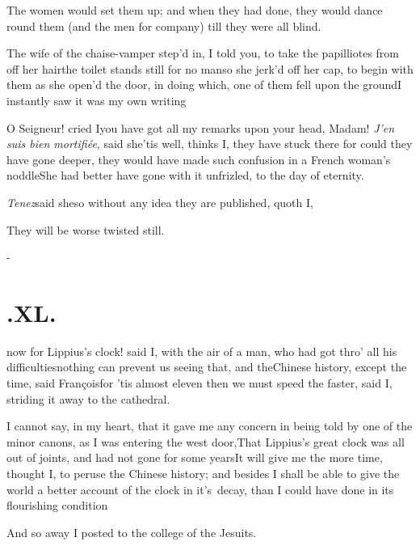 \documentclass{article}
\begin{document}
The women would set them up; and when they had done, they would
dance round them (and the men for company) till they were all
blind.

The wife of the chaise-vamper step’d in, I told you, to
take the papilliotes from off her hair\tsh the toilet
stands still for no man\tsh so she jerk’d off her
cap, to begin with them as she open’d the door, in doing
which, one of them fell upon the ground\tsk I instantly saw it was my own
writing\tsh

O Seigneur! cried I\tsk you have got all my remarks upon your
head, Madam!\break
\tsh \textit{J’en suis bien
mortifiée}, said she\tsh ’tis well, thinks
I, they have stuck there\break
\tsk for could they have gone deeper,
they would have made such confusion in a French
woman’s noddle\tsk She had better have gone with it
unfrizled, to the day of eternity.

\textit{Tenez}\tsk said she\tsk so without any idea
they are published, quoth I,\tsh

They will be worse twisted still.

\vfill{}\eject
\null\kern-\baselineskip
\section{.\enspace XL.}

 now for Lippius’s
clock! said I, with the air of a man, who had got thro’ all
his difficulties\tsh nothing can prevent us seeing that,
and the\break Chinese history, \etc except the time,\break
said François\tsh for ’tis almost
eleven\break
\tsk then we must speed the faster, said I, striding it
away to the cathedral.

I cannot say, in my heart, that it gave me any concern in being
told by one of the minor canons, as I was entering the west
door,\tsk That Lippius’s great clock was all out of
joints, and had not gone for some years\tsh It will give
me the more time, thought I, to peruse the Chinese history;
and besides I shall be able to give the world a better account of
the
clock in it’s\sic\ decay, than I could have\break
done in its flourishing condition\tsh

\tsh And so away I posted to the college of the
Jesuits.
\end{document}
